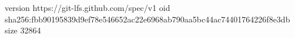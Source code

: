 version https://git-lfs.github.com/spec/v1
oid sha256:fbb90195839d9ef78e546652ac22e6968ab790aa5bc44ac74401764226f8e3db
size 32864
